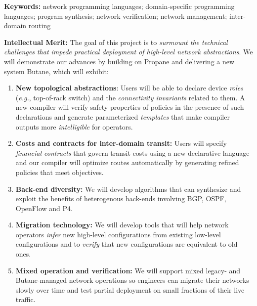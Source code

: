 \documentclass[12pt]{article}
\makeatletter
\newcommand{\Propane}{{\sc Propane}\@\xspace}
\newcommand{\Name}{{\sc Butane}\@\xspace}
\makeatother
\begin{document}
\noindent\textbf{Keywords:} network programming languages;
domain-specific programming languages; program synthesis; 
network verification; network management; inter-domain routing

\noindent
\textbf{Intellectual Merit:} 
The goal of this project is to 
{\em surmount the technical challenges that impede practical 
deployment of high-level network abstractions}.  We will demonstrate
our advances by building on \Propane and delivering a new system \Name, which
will exhibit:  
\begin{enumerate}
\item {\bf New topological abstractions}:  Users will be able to declare device 
\emph{roles} (\emph{e.g.}, top-of-rack switch)
and the \emph{connectivity invariants} related to them.  A new compiler
will verify safety properties of policies in the presence of such 
declarations and generate parameterized \emph{templates}
that make compiler outputs more \emph{intelligible} for operators.  
\item {\bf Costs and contracts for inter-domain transit:}
Users will specify 
\emph{financial contracts} that govern transit
costs using a new declarative language and our compiler will
optimize routes automatically by generating refined policies that meet objectives.
\item {\bf Back-end diversity:}  We will develop algorithms that
can synthesize and exploit the benefits of heterogenous back-ends 
involving BGP, OSPF, OpenFlow and P4.
\item {\bf Migration technology:} We will develop
tools that will help network operators \emph{infer} 
new high-level configurations from existing low-level configurations
and to \emph{verify} that new configurations are equivalent to old ones.
\item {\bf Mixed operation and verification:} We will support mixed
legacy- and \Name-managed network operations so engineers can
migrate their networks slowly over time and test partial deployment on
small fractions of their live traffic.
\end{enumerate}
\end{document}
